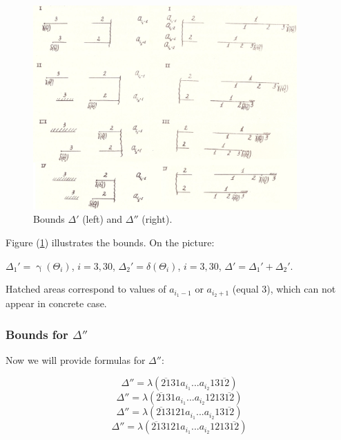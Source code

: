 \documentclass[a4paper, 12pt]{article}
\let\oldref\ref
\renewcommand{\ref}[1]{(\oldref{#1})}
\theoremstyle{definition}
\theoremstyle{definition}
\theoremstyle{proposition}
\theoremstyle{lemma}
\newcommand{\g}{\upgamma}
\renewcommand{\d}{\delta}
\newcommand{\D}{\Delta}
\newcommand{\T}{\Theta}
\begin{document}
\begin{figure}[p]
	\centering
	\includegraphics[width=0.9\textwidth]{pic1}
	\caption{Bounds $\D'$ (left) and $\D''$ (right).}
	\label{pic1}
\end{figure}

Figure \ref{pic1} illustrates the bounds. On the picture:

$\D_1' = \g(\T_i)$, $i=3,30$,
$\D_2' = \d  (\T_i)$, $i=3,30$,
$\D' = \D_1' + \D_2'$.

Hatched areas correspond to values of $a_{i_1 - 1}$ or $a_{i_2 + 1}$ (equal 3),
which can not appear in concrete case.

\subsubsection{Bounds for $\D''$}
Now we will provide formulas for $\D''$:

\begin{equation}\tag{11.13}
	\D'' = \lambda(\overline{21}31a_{i_1}... a_{i_2}13\overline{12})
\end{equation}
\begin{equation}\tag{11.14}
	\D'' = \lambda(\overline{21}31a_{i_1}... a_{i_2}1213\overline{12})
\end{equation}
\begin{equation}\tag{11.15}
	\D'' = \lambda(\overline{21}3121a_{i_1}... a_{i_2}13\overline{12})
\end{equation}
\begin{equation}\tag{11.16}
	\D'' = \lambda(\overline{21}3121a_{i_1}... a_{i_2}1213\overline{12})
\end{equation}
\end{document}
